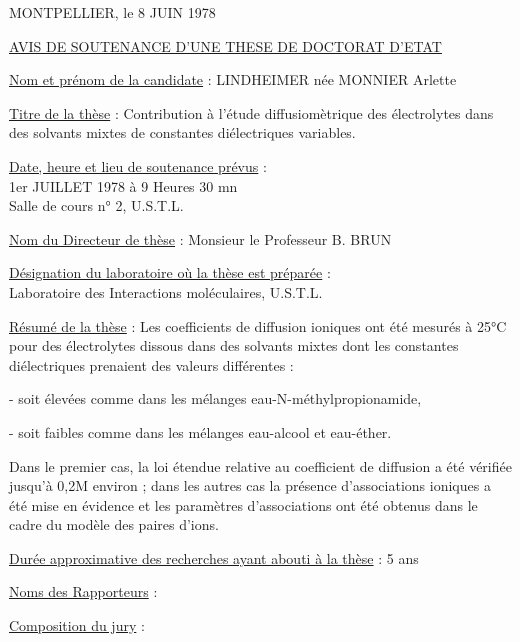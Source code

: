 MONTPELLIER, le 8 JUIN 1978

\uline{AVIS DE SOUTENANCE D'UNE THESE DE DOCTORAT D'ETAT}

\uline{Nom et prénom de la candidate} : LINDHEIMER née MONNIER Arlette

\uline{Titre de la thèse} : Contribution à l'étude diffusiomètrique des électrolytes dans des solvants mixtes de constantes diélectriques variables.

\uline{Date, heure et lieu de soutenance prévus} :\\
1er JUILLET 1978 à 9 Heures 30 mn\\
Salle de cours n° 2, U.S.T.L.

\uline{Nom du Directeur de thèse} : Monsieur le Professeur B. BRUN

\uline{Désignation du laboratoire où la thèse est préparée} :\\
Laboratoire des Interactions moléculaires, U.S.T.L.

\uline{Résumé de la thèse} : Les coefficients de diffusion ioniques ont été mesurés à 25°C pour des électrolytes dissous dans des solvants mixtes dont les constantes diélectriques prenaient des valeurs différentes :

- soit élevées comme dans les mélanges eau-N-méthylpropionamide,

- soit faibles comme dans les mélanges eau-alcool et eau-éther.

Dans le premier cas, la loi étendue relative au coefficient de diffusion a été vérifiée jusqu'à 0,2M environ ; dans les autres cas la présence d'associations ioniques a été mise en évidence et les paramètres d'associations ont été obtenus dans le cadre du modèle des paires d'ions.

\uline{Durée approximative des recherches ayant abouti à la thèse} : 5 ans

\uline{Noms des Rapporteurs} :


\uline{Composition du jury} :

